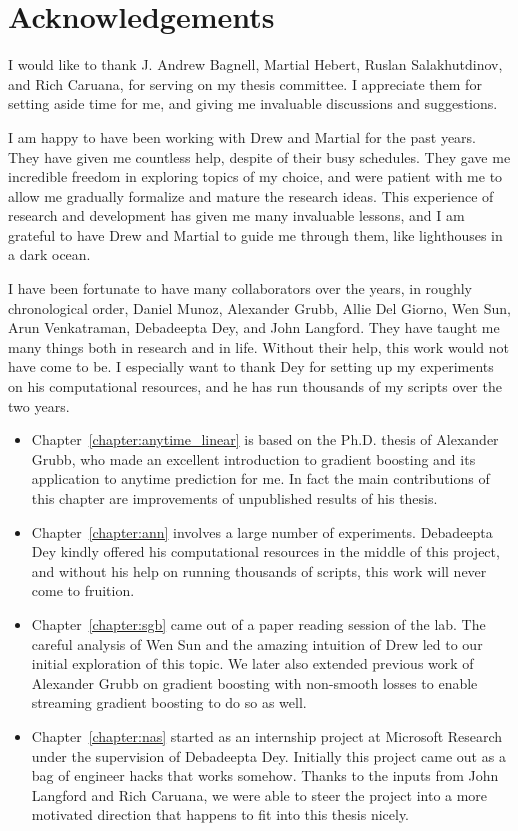 \documentclass[review,12pt]{cmuthesis}
\begin{document}
\chapter*{Acknowledgements} 

I would like to thank J. Andrew Bagnell, Martial Hebert, Ruslan Salakhutdinov, and Rich Caruana, for serving on my thesis committee.
I appreciate them for setting aside time for me, and giving me invaluable discussions and suggestions. 

I am happy to have been working with Drew and Martial for the past years. 
They have given me countless help, despite of their busy schedules. 
They gave me incredible freedom in exploring topics of my choice, 
and were patient with me to allow me gradually formalize and mature the research ideas. 
This experience of research and development has given me many invaluable lessons, and I am grateful to have 
Drew and Martial to guide me through them, like lighthouses in a dark ocean. 

I have been fortunate to have many collaborators over the years, in roughly chronological order,
Daniel Munoz, Alexander Grubb, Allie Del Giorno, Wen Sun, Arun Venkatraman,  Debadeepta Dey, and John Langford. 
They have taught me many things both in research and in life. Without their help, this work would not have
come to be. I especially want to thank Dey for setting up my experiments on his computational resources, 
and he has run thousands of my scripts over the two years. 

\begin{itemize}
\item Chapter~\ref{chapter:anytime_linear} is based on the Ph.D. thesis of Alexander Grubb, who made an 
excellent introduction to gradient boosting and its application to anytime prediction for me. In fact the
main contributions of this chapter are improvements of unpublished results of his thesis.
\item Chapter~\ref{chapter:ann} involves a large number of experiments. Debadeepta Dey kindly offered his 
computational resources in the middle of this project, and without his help on running thousands of
scripts, this work will never come to fruition. 
\item Chapter~\ref{chapter:sgb} came out of a paper reading session of the lab. The careful analysis of 
Wen Sun and the amazing intuition of Drew led to our initial exploration of this topic. We later also extended
previous work of Alexander Grubb on gradient boosting with non-smooth losses to enable streaming gradient 
boosting to do so as well. 
\item Chapter~\ref{chapter:nas} started as an internship project at Microsoft Research under the supervision 
of Debadeepta Dey. Initially this project came out as a bag of engineer hacks that works somehow. 
Thanks to the inputs from John Langford and Rich Caruana, we were able to steer the project into a more 
motivated direction that happens to fit into this thesis nicely.
\end{itemize}
\end{document}
